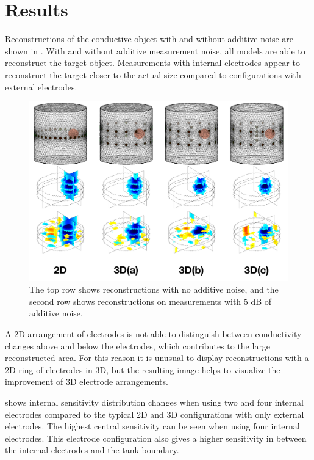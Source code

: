 \section{Results}

Reconstructions of the conductive object with and without additive noise are 
shown in . With and without additive measurement noise,
all models are able to reconstruct the target object. 
Measurements with internal electrodes appear to reconstruct the target 
closer to the actual size compared to configurations with external electrodes.

\begin{figure}[H]
\centering
\includegraphics[width=\textwidth]{chapter6-internal_electrodes/imgs/Image_Comparison.pdf}
\caption[Internal electrode simulation reconstructions]{The top row shows reconstructions with no additive noise, and the second row shows reconstructions on measurements with 5 dB of
additive noise.}
\label{fig:reconstruction_comparison}
\end{figure}

A 2D arrangement of electrodes is not able to distinguish between 
conductivity changes above and below the electrodes, which contributes to the large
reconstructed area. For this reason it is unusual to display reconstructions 
with a 2D ring of electrodes in 3D, but the resulting image helps to visualize the
improvement of 3D electrode arrangements.

 shows internal sensitivity distribution changes when 
using two and four internal electrodes compared to the
typical 2D and 3D configurations with only external electrodes. 
The highest central sensitivity can be seen when using four internal 
electrodes. This electrode configuration also 
gives a higher sensitivity in between the internal electrodes
and the tank boundary.

